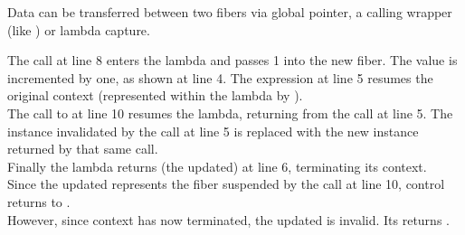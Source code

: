 
Data can be transferred between two fibers via global pointer, a calling
wrapper (like ) or lambda capture.

The \resume call at line 8 enters the lambda and passes 1 into the
new fiber. The value is incremented by one, as shown at line 4. The expression
 at line 5 resumes the original context (represented
within the lambda by ).\\
The call to  at line 10 resumes the lambda, returning from
the  call at line 5. The \fiber instance 
invalidated by the \resume call at line 5 is replaced with the new instance
returned by that same \resume call.\\
Finally the lambda returns (the updated)  at line 6, terminating its
context.\\

Since the updated  represents the fiber suspended by the call at
line 10, control returns to \main.\\

However, since context  has now terminated, the updated 
is invalid. Its \opbool returns .\\

